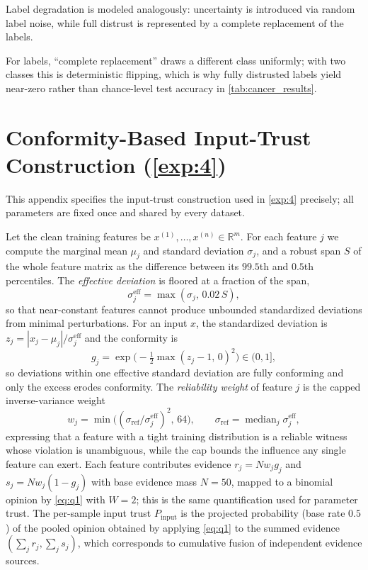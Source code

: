 Label degradation is modeled analogously: uncertainty is introduced via random label noise, while full distrust is represented by a complete replacement of the labels.

For labels, ``complete replacement'' draws a different class uniformly; with two classes this is deterministic flipping, which is why fully distrusted labels yield near-zero rather than chance-level test accuracy in \cref{tab:cancer_results}.

\section{Conformity-Based Input-Trust Construction (\cref{exp:4})}\label{app:conformity}
This appendix specifies the input-trust construction used in \cref{exp:4} precisely; all parameters are fixed once and shared by every dataset.

Let the clean training features be $x^{(1)},\dots,x^{(n)} \in \mathbb{R}^m$. For each feature $j$ we compute the marginal mean $\mu_j$ and standard deviation $\sigma_j$, and a robust span $S$ of the whole feature matrix as the difference between its $99.5$th and $0.5$th percentiles. The \emph{effective deviation} is floored at a fraction of the span,
\[
\sigma^{\mathrm{eff}}_j = \max(\sigma_j,\, 0.02\, S),
\]
so that near-constant features cannot produce unbounded standardized deviations from minimal perturbations. For an input $x$, the standardized deviation is $z_j = |x_j - \mu_j| / \sigma^{\mathrm{eff}}_j$ and the conformity is
\[
g_j = \exp\!\big(-\tfrac{1}{2}\max(z_j - 1,\, 0)^2\big) \in (0,1],
\]
so deviations within one effective standard deviation are fully conforming and only the excess erodes conformity. The \emph{reliability weight} of feature $j$ is the capped inverse-variance weight
\[
w_j = \min\!\big((\sigma_{\mathrm{ref}} / \sigma^{\mathrm{eff}}_j)^2,\, 64\big),
\qquad \sigma_{\mathrm{ref}} = \operatorname{median}_j \sigma^{\mathrm{eff}}_j,
\]
expressing that a feature with a tight training distribution is a reliable witness whose violation is unambiguous, while the cap bounds the influence any single feature can exert. Each feature contributes evidence $r_j = N w_j g_j$ and $s_j = N w_j (1-g_j)$ with base evidence mass $N = 50$, mapped to a binomial opinion by \cref{eq:q1} with $W = 2$; this is the same quantification used for parameter trust. The per-sample input trust $P_{\mathrm{input}}$ is the projected probability (base rate $0.5$) of the pooled opinion obtained by applying \cref{eq:q1} to the summed evidence $(\sum_j r_j, \sum_j s_j)$, which corresponds to cumulative fusion of independent evidence sources.

